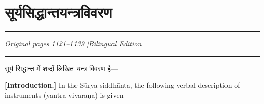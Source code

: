 \documentclass[11pt,a4paper]{article}
\newcommand{\dev}[1]{{\devanagarifont #1}}
\newcommand{\bilingualpair}[2]{%
  \noindent%
  \begin{minipage}[t]{0.48\textwidth}
    #1%
  \end{minipage}%
  \hfill%
  \begin{minipage}[t]{0.48\textwidth}
    #2%
  \end{minipage}%
  \par\vspace{0.5em}%
}
\newenvironment{sanskritcol}{\devanagarifont\small}{}
\newenvironment{englishcol}{\iastfont\small}{}
\begin{document}
\newpage

\section*{\dev{सूर्यसिद्धान्तयन्त्रविवरण}}

\noindent\rule{\textwidth}{0.6pt}
\begin{center}
\textit{Original pages 1121--1139 \quad|\quad Bilingual Edition}
\end{center}
\noindent\rule{\textwidth}{0.6pt}
\vspace{0.5cm}

\bilingualpair{%
\begin{sanskritcol}
\dev{सूर्य सिद्धान्त में शब्दों लिखित यन्त्र विवरण है---}
\end{sanskritcol}%
}{%
\begin{englishcol}
\textbf{[Introduction.]} In the Sūrya-siddhānta, the following verbal description of instruments (yantra-vivaraṇa) is given ---
\end{englishcol}%
}
\end{document}
